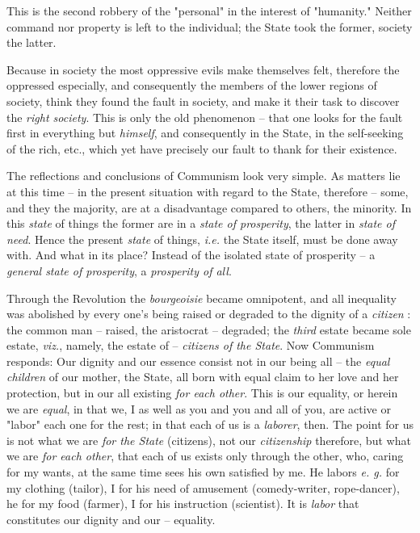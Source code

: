This is the second robbery of the "{}personal"{} in the interest of 
"{}humanity."{} Neither command nor property is left to the individual; the 
State took the former, society the latter.

Because in society the most oppressive evils make themselves felt, therefore 
the oppressed especially, and consequently the members of the lower regions of 
society, think they found the fault in society, and make it their task to 
discover the \textit{right society}. This is only the old phenomenon -- that 
one looks for the fault first in everything but \textit{himself}, and 
consequently in the State, in the self-seeking of the rich, etc., which yet 
have precisely our fault to thank for their existence.

 The reflections and conclusions of Communism look very simple. As matters lie 
at this time -- in the present situation with regard to the State, therefore 
-- some, and they the majority, are at a disadvantage compared to others, the 
minority. In this \textit{state} of things the former are in a \textit{state 
of prosperity}, the latter in \textit{state of need}. Hence the present 
\textit{state} of things, \textit{i.e.} the State itself, must be done away 
with. And what in its place? Instead of the isolated state of prosperity -- a 
\textit{general state of prosperity}, a \textit{prosperity of all}.

Through the Revolution the \textit{bourgeoisie} became omnipotent, and all 
inequality was abolished by every one's being raised or degraded to the 
dignity of a \textit{citizen} : the common man -- raised, the aristocrat -- 
degraded; the \textit{third} estate became sole estate, \textit{viz.}, namely, 
the estate of -- \textit{citizens of the State}. Now Communism responds: Our 
dignity and our essence consist not in our being all -- the \textit{equal 
children} of our mother, the State, all born with equal claim to her love and 
her protection, but in our all existing \textit{for each other}. This is our 
equality, or herein we are \textit{equal}, in that we, I as well as you and 
you and all of you, are active or "{}labor"{} each one for the rest; in that 
each of us is a \textit{laborer}, then. The point for us is not what we are 
\textit{for the State} (citizens), not our \textit{citizenship} therefore, but 
what we are \textit{for each other}, that each of us exists only through the 
other, who, caring for my wants, at the same time sees his own satisfied by 
me. He labors \textit{e. g.} for my clothing (tailor), I for his need of 
amusement (comedy-writer, rope-dancer), he for my food (farmer), I for his 
instruction (scientist). It is \textit{labor} that constitutes our dignity and 
our -- equality.

